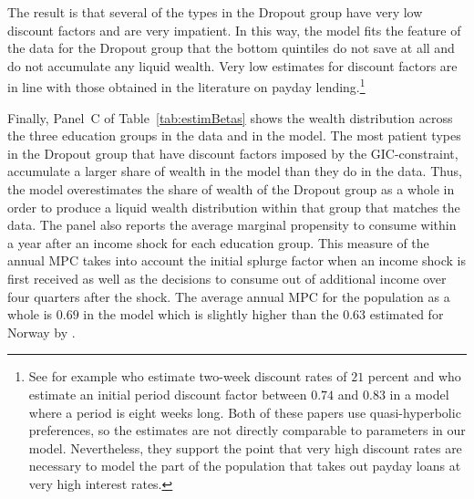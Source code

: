 \documentclass[../HAFiscal]{subfiles}
\begin{document}
The result is that several of the types in the Dropout group have very low discount factors and are very impatient. In this way, the model fits the feature of the data for the Dropout group that the bottom quintiles do not save at all and do not accumulate any liquid wealth. Very low estimates for discount factors are in line with those obtained in the literature on payday lending.\footnote{See for example \cite{skiba2008payday} who estimate two-week discount rates of $21$ percent and \cite{allcott2021high} who estimate an initial period discount factor between $0.74$ and $0.83$ in a model where a period is eight weeks long. Both of these papers use quasi-hyperbolic preferences, so the estimates are not directly comparable to parameters in our model. Nevertheless, they support the point that very high discount rates are necessary to model the part of the population that takes out payday loans at very high interest rates.} 

Finally, Panel~C of Table~\ref{tab:estimBetas} shows the wealth distribution across the three education groups in the data and in the model. The most patient types in the Dropout group that have discount factors imposed by the GIC-constraint, accumulate a larger share of wealth in the model than they do in the data. Thus, the model overestimates the share of wealth of the Dropout group as a whole in order to produce a liquid wealth distribution within that group that matches the data. The panel also reports the average marginal propensity to consume within a year after an income shock for each education group. This measure of the annual MPC takes into account the initial splurge factor when an income shock is first received as well as the decisions to consume out of additional income over four quarters after the shock. The average annual MPC for the population as a whole is $0.69$ in the model which is slightly higher than the $0.63$ estimated for Norway by \cite{fagereng_mpc_2021}. 
\end{document}

